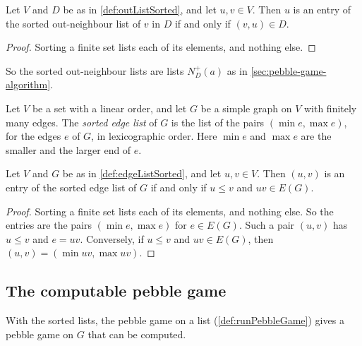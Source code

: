 \begin{lemma}
  \label{lem:mem-outListSorted}
  \leanok
  Let $V$ and $D$ be as in \cref{def:outListSorted}, and let
  $u, v \in V$. Then $u$ is an entry of the sorted out-neighbour list of
  $v$ in $D$ if and only if $(v, u) \in D$.
\end{lemma}
\begin{proof}
  \leanok
  Sorting a finite set lists each of its elements, and nothing else.
\end{proof}

So the sorted out-neighbour lists are lists $N^+_D(a)$ as in
\cref{sec:pebble-game-algorithm}.

\begin{definition}
  \label{def:edgeListSorted}
  \leanok
  Let $V$ be a set with a linear order, and let $G$ be a simple graph
  on $V$ with finitely many edges. The \emph{sorted edge list} of $G$
  is the list of the pairs $(\min e, \max e)$, for the edges $e$ of
  $G$, in lexicographic order. Here $\min e$ and $\max e$ are the smaller and the larger end
  of $e$.
\end{definition}

\begin{lemma}
  \label{lem:mem-edgeListSorted}
  \leanok
  Let $V$ and $G$ be as in \cref{def:edgeListSorted}, and let
  $u, v \in V$. Then $(u, v)$ is an entry of the sorted edge list of $G$
  if and only if $u \le v$ and $uv \in E(G)$.
\end{lemma}
\begin{proof}
  \leanok
  Sorting a finite set lists each of its elements, and nothing else. So
  the entries are the pairs $(\min e, \max e)$ for $e \in E(G)$. Such a
  pair $(u, v)$ has $u \le v$ and $e = uv$. Conversely, if $u \le v$ and
  $uv \in E(G)$, then $(u, v) = (\min uv, \max uv)$.
\end{proof}

\subsection{The computable pebble game}
\label{sec:executable-wrapper}

With the sorted lists, the pebble game on a list
(\cref{def:runPebbleGame}) gives a pebble game on $G$ that can be
computed.


